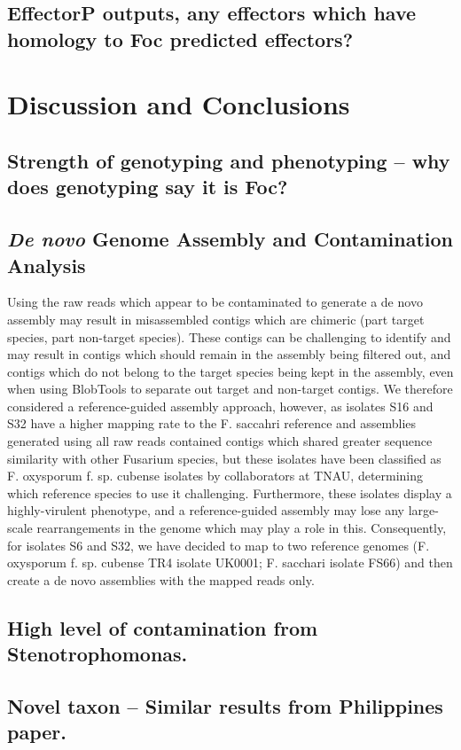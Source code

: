 \subsection{EffectorP outputs, any effectors which have homology to Foc predicted effectors?}



\section{Discussion and Conclusions}
\subsection{Strength of genotyping and phenotyping – why does genotyping say it is Foc?}
\subsection{\textit{De novo} Genome Assembly and Contamination Analysis}
Using the raw reads which appear to be contaminated to generate a de novo assembly may result in misassembled contigs which are chimeric (part target species, part non-target species). These contigs can be challenging to identify and may result in contigs which should remain in the assembly being filtered out, and contigs which do not belong to the target species being kept in the assembly, even when using BlobTools to separate out target and non-target contigs. We therefore considered a reference-guided assembly approach, however, as isolates S16 and S32 have a higher mapping rate to the F. saccahri reference and assemblies generated using all raw reads contained contigs which shared greater sequence similarity with other Fusarium species, but these isolates have been classified as F. oxysporum f. sp. cubense isolates by collaborators at TNAU, determining which reference species to use it challenging. Furthermore, these isolates display a highly-virulent phenotype, and a reference-guided assembly may lose any large-scale rearrangements in the genome which may play a role in this. Consequently, for isolates S6 and S32, we have decided to map to two reference genomes (F. oxysporum f. sp. cubense TR4 isolate UK0001; F. sacchari isolate FS66) and then create a de novo assemblies with the mapped reads only. 
\subsection{High level of contamination from Stenotrophomonas.}
\subsection{Novel taxon – Similar results from Philippines paper.}

